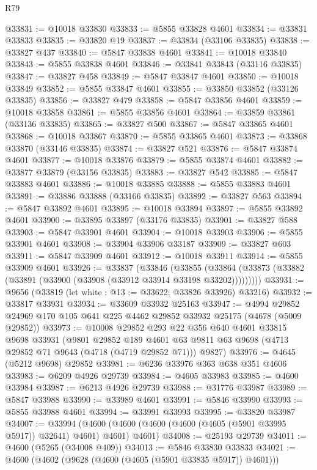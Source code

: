 \begin{lexlean}{R79}
\begin{coremodule}
@33831 := @10018 @33830
@33833 := @5855 @33828 @4601
@33834 := @33831 @33833
@33835 := @33820 @19
@33837 := @33834 (@33106 @33835)
@33838 := @33827 @437
@33840 := @5847 @33838 @4601
@33841 := @10018 @33840
@33843 := @5855 @33838 @4601
@33846 := @33841 @33843 (@33116 @33835)
@33847 := @33827 @458
@33849 := @5847 @33847 @4601
@33850 := @10018 @33849
@33852 := @5855 @33847 @4601
@33855 := @33850 @33852 (@33126 @33835)
@33856 := @33827 @479
@33858 := @5847 @33856 @4601
@33859 := @10018 @33858
@33861 := @5855 @33856 @4601
@33864 := @33859 @33861 (@33136 @33835)
@33865 := @33827 @500
@33867 := @5847 @33865 @4601
@33868 := @10018 @33867
@33870 := @5855 @33865 @4601
@33873 := @33868 @33870 (@33146 @33835)
@33874 := @33827 @521
@33876 := @5847 @33874 @4601
@33877 := @10018 @33876
@33879 := @5855 @33874 @4601
@33882 := @33877 @33879 (@33156 @33835)
@33883 := @33827 @542
@33885 := @5847 @33883 @4601
@33886 := @10018 @33885
@33888 := @5855 @33883 @4601
@33891 := @33886 @33888 (@33166 @33835)
@33892 := @33827 @563
@33894 := @5847 @33892 @4601
@33895 := @10018 @33894
@33897 := @5855 @33892 @4601
@33900 := @33895 @33897 (@33176 @33835)
@33901 := @33827 @588
@33903 := @5847 @33901 @4601
@33904 := @10018 @33903
@33906 := @5855 @33901 @4601
@33908 := @33904 @33906 @33187
@33909 := @33827 @603
@33911 := @5847 @33909 @4601
@33912 := @10018 @33911
@33914 := @5855 @33909 @4601
@33926 := @33837
    (@33846
      (@33855 (@33864 (@33873 (@33882 (@33891 (@33900 (@33908 (@33912 @33914 @33198 @33202)))))))))
@33931 := @9656 (@33819 (let white : @13 := @33622; @33826 @33926) @33216)
@33932 := @33817 @33931
@33934 := @33609 @33932 @25163
@33947 := @4994 @29852 @24969 @170 @105 @641 @225 @4462 @29852 @33932 @25175 (@4678 (@5009 @29852))
@33973 := @10008
    @29852
    @293
    @22
    @356
    @640
    @4601
    @33815
    @9698
    @33931
    (@9801
      @29852
      @189
      @4601
      @63
      @9811
      @63
      @9698
      (@4713 @29852 @71 @9643 (@4718 (@4719 @29852 @71)))
      @9827)
@33976 := @4645 (@5212 @9698) @29852
@33981 := @6236 @33976 @363 @638 @351 @4606
@33983 := @6209 @4926 @29739
@33984 := @4605 @33983
@33985 := @4600 @33984
@33987 := @6213 @4926 @29739
@33988 := @31776 @33987
@33989 := @5847 @33988
@33990 := @33989 @4601
@33991 := @5846 @33990
@33993 := @5855 @33988 @4601
@33994 := @33991 @33993
@33995 := @33820 @33987
@34007 := @33994
    (@4600 (@4600 (@4600 (@4600 (@4605 (@5901 @33995 @5917)) @32641) @4601) @4601) @4601)
@34008 := @25193 @29739
@34011 := @4600 (@5265 (@34008 @409))
@34013 := @5846 @33830 @33833
@34021 := @4600 (@4602 (@9628 (@4600 (@4605 (@5901 @33835 @5917)) @4601)))

\end{coremodule}
\end{lexlean}
